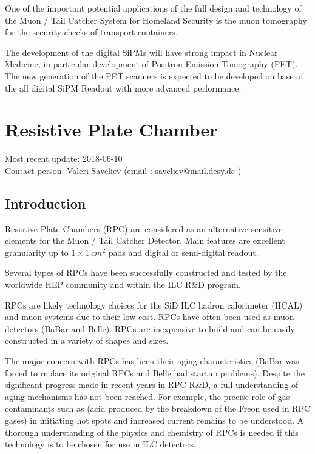 One of the important potential applications of the full design and technology of the Muon / Tail Catcher System for Homeland Security is the muon tomography for the security checks of transport containers.

The development of the digital SiPMs will have strong impact in Nuclear Medicine, in particular development of Positron Emission Tomography (PET). The new generation of the PET scanners is expected to be developed on base of the all digital SiPM Readout with more advanced performance.

\section{Resistive Plate Chamber }
Most recent update: 2018-06-10 \\
Contact person: Valeri Saveliev (email : saveliev@mail.desy.de )

\subsection{Introduction}

Resistive Plate Chambers (RPC) are considered as an alternative sensitive elements for the Muon / Tail Catcher Detector.
Main features are excellent granularity up to $1\times\SI{1}{cm^2}$ pads and digital or semi-digital readout.

Several types of RPCs have been successfully constructed and tested by the worldwide HEP community and within the ILC R\&D program.

RPCs are likely technology choices for the SiD ILC hadron calorimeter (HCAL) and muon systems due to their low cost.
RPCs have often been used as muon detectors (BaBar and Belle). RPCs are inexpensive to build and can be easily constructed in a variety of shapes and sizes.

The major concern with RPCs has been their aging characteristics (BaBar was forced to replace its original RPCs and Belle had startup problems).
Despite the significant progress made in recent years in RPC R\&D, a full understanding of aging mechanisms has not been reached.
For example, the precise role of gas contaminants such as  (acid produced by the breakdown of the Freon used in RPC gases) in initiating hot spots and increased current remains to be understood. A thorough understanding of the physics and chemistry of RPCs is needed if this technology is to be chosen for use in ILC detectors.

